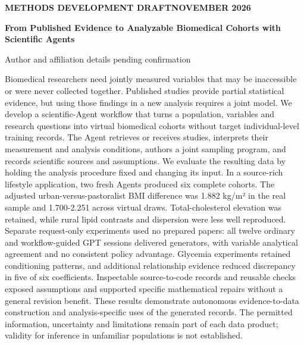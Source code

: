 \documentclass[11pt,letterpaper]{article}
\renewenvironment{abstract}{\small\par\noindent{\sffamily\bfseries\color{ink}Abstract}\quad\ignorespaces}{\par\medskip}
\begin{document}
\thispagestyle{plain}
{\sffamily\footnotesize\color{accent}\bfseries METHODS DEVELOPMENT DRAFT\quad\textbar\quad NOVEMBER 2026\par}
\vspace{.7em}
{\raggedright\sffamily\bfseries\fontsize{24}{29}\selectfont\color{ink}From Published Evidence to Analyzable Biomedical Cohorts with Scientific Agents\par}
\vspace{.5em}
{\small Author and affiliation details pending confirmation\par}
\vspace{.7em}
\begin{abstract}

Biomedical researchers need jointly measured variables that may be inaccessible or were never collected together. Published studies provide partial statistical evidence, but using those findings in a new analysis requires a joint model. We develop a scientific-Agent workflow that turns a population, variables and research questions into virtual biomedical cohorts without target individual-level training records. The Agent retrieves or receives studies, interprets their measurement and analysis conditions, authors a joint sampling program, and records scientific sources and assumptions. We evaluate the resulting data by holding the analysis procedure fixed and changing its input. In a source-rich lifestyle application, two fresh Agents produced six complete cohorts. The adjusted urban-versus-pastoralist BMI difference was 1.882 kg/\allowbreak{}m² in the real sample and 1.700-2.251 across virtual draws. Total-cholesterol elevation was retained, while rural lipid contrasts and dispersion were less well reproduced. Separate request-only experiments used no prepared papers: all twelve ordinary and workflow-guided GPT sessions delivered generators, with variable analytical agreement and no consistent policy advantage. Glycemia experiments retained conditioning patterns, and additional relationship evidence reduced discrepancy in five of six coefficients. Inspectable source-to-code records and reusable checks exposed assumptions and supported specific mathematical repairs without a general revision benefit. These results demonstrate autonomous evidence-to-data construction and analysis-specific uses of the generated records. The permitted information, uncertainty and limitations remain part of each data product; validity for inference in unfamiliar populations is not established.

\end{abstract}
\end{document}
